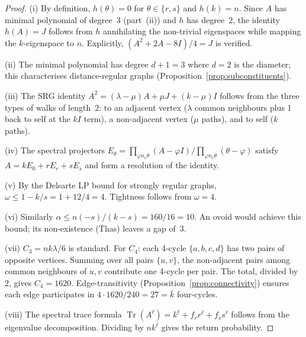\documentclass[12pt,a4paper]{article}
\renewcommand{\ne}{n_{\!e}}
\begin{document}
\begin{proof}
(i) By definition, $h(\theta) = 0$ for $\theta \in \{r, s\}$ and $h(k) = n$.
Since $A$ has minimal polynomial of degree~$3$ (part~(ii)) and $h$ has
degree~$2$, the identity $h(A) = J$ follows from $h$ annihilating the
non-trivial eigenspaces while mapping the $k$-eigenspace to $n$.
Explicitly, $(A^2 + 2A - 8I)/4 = J$ is verified.

(ii) The minimal polynomial has degree $d+1 = 3$ where $d = 2$ is the
diameter; this characterises distance-regular graphs
(Proposition~\ref{prop:subconstituents}).

(iii) The SRG identity $A^2 = (\lambda{-}\mu)A + \mu J + (k{-}\mu)I$
follows from the three types of walks of length~$2$: to an
adjacent vertex ($\lambda$ common neighbours plus 1 back to self at the
$k I$ term), a non-adjacent vertex ($\mu$ paths), and to self ($k$ paths).

(iv) The spectral projectors $E_\theta = \prod_{\varphi \ne \theta}
(A - \varphi I) / \prod_{\varphi \ne \theta}(\theta - \varphi)$
satisfy $A = k E_0 + r E_r + s E_s$ and form a resolution of the identity.

(v) By the Delsarte LP bound for strongly regular graphs,
$\omega \le 1 - k/s = 1 + 12/4 = 4$.  Tightness follows from $\omega = 4$.

(vi) Similarly $\alpha \le n(-s)/(k{-}s) = 160/16 = 10$.
An ovoid would achieve this bound; its non-existence (Thas) leaves a gap of~$3$.

(vii) $C_3 = nk\lambda/6$ is standard.
For $C_4$: each 4-cycle $\{a,b,c,d\}$ has two pairs of opposite vertices.
Summing over all pairs $\{u,v\}$, the non-adjacent pairs among common
neighbours of $u,v$ contribute one 4-cycle per pair.
The total, divided by~$2$, gives $C_4 = 1620$.
Edge-transitivity (Proposition~\ref{prop:connectivity}) ensures each edge
participates in $4 \cdot 1620 / 240 = 27 = \bar k$ four-cycles.

(viii) The spectral trace formula $\operatorname{Tr}(A^\ell)
= k^\ell + f_r r^\ell + f_s s^\ell$ follows from the eigenvalue
decomposition.  Dividing by $n k^\ell$ gives the return probability.
\end{proof}
\end{document}
